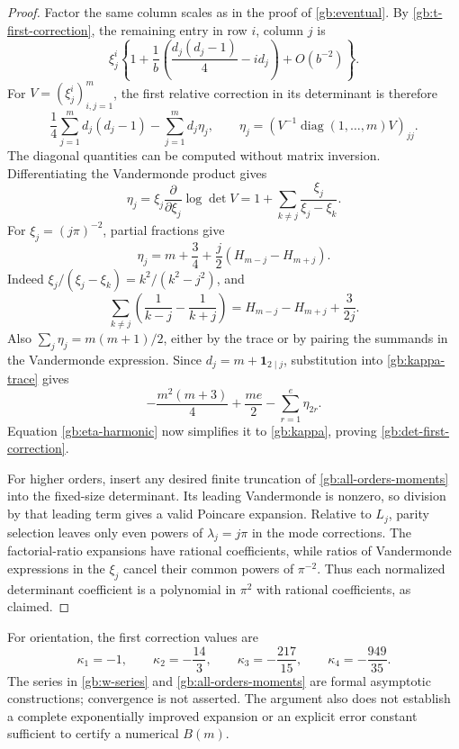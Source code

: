 \documentclass[11pt,a4paper]{article}
\numberwithin{equation}{section}
\theoremstyle{definition}
\theoremstyle{remark}
\newcommand{\ind}{\mathbf 1}
\begin{document}
\begin{proof}
Factor the same column scales as in the proof of
\cref{gb:eventual}.  By \eqref{gb:t-first-correction}, the remaining
entry in row $i$, column $j$ is
\[
 \xi_j^i\left\{1+\frac1b
           \left(\frac{d_j(d_j-1)}4-id_j\right)+O(b^{-2})\right\}.
\]
For $V=(\xi_j^i)_{i,j=1}^m$, the first relative correction in its
determinant is therefore
\begin{equation}\label{gb:kappa-trace}
 \frac14\sum_{j=1}^md_j(d_j-1)-\sum_{j=1}^md_j\eta_j,
 \qquad
 \eta_j=\left(V^{-1}\operatorname{diag}(1,\ldots,m)V\right)_{jj}.
\end{equation}
The diagonal quantities can be computed without matrix inversion.
Differentiating the Vandermonde product gives
\[
 \eta_j=\xi_j\frac{\partial}{\partial\xi_j}\log\det V
       =1+\sum_{k\ne j}\frac{\xi_j}{\xi_j-\xi_k}.
\]
For $\xi_j=(j\pi)^{-2}$, partial fractions give
\begin{equation}\label{gb:eta-harmonic}
 \eta_j=m+\frac34+\frac j2(H_{m-j}-H_{m+j}).
\end{equation}
Indeed $\xi_j/(\xi_j-\xi_k)=k^2/(k^2-j^2)$, and
\[
 \sum_{k\ne j}\left(\frac1{k-j}-\frac1{k+j}\right)
        =H_{m-j}-H_{m+j}+\frac{3}{2j}.
\]
Also $\sum_j\eta_j=m(m+1)/2$, either by the trace or by
pairing the summands in the Vandermonde expression.  Since
$d_j=m+\ind_{2\mid j}$, substitution into
\eqref{gb:kappa-trace} gives
\[
 -\frac{m^2(m+3)}4+\frac{me}{2}
                         -\sum_{r=1}^e\eta_{2r}.
\]
Equation \eqref{gb:eta-harmonic} now simplifies it to
\eqref{gb:kappa}, proving \eqref{gb:det-first-correction}.

For higher orders, insert any desired finite truncation of
\eqref{gb:all-orders-moments} into the fixed-size determinant.
Its leading Vandermonde is nonzero, so division by that leading
term gives a valid Poincare expansion.  Relative to $L_j$, parity
selection leaves only even powers of $\lambda_j=j\pi$ in the
mode corrections.  The factorial-ratio expansions have rational
coefficients, while ratios of Vandermonde expressions in the
$\xi_j$ cancel their common powers of $\pi^{-2}$.  Thus each
normalized determinant coefficient is a polynomial in $\pi^2$
with rational coefficients, as claimed.
\end{proof}

For orientation, the first correction values are
\[
 \kappa_1=-1,\qquad\kappa_2=-\frac{14}{3},\qquad
 \kappa_3=-\frac{217}{15},\qquad\kappa_4=-\frac{949}{35}.
\]
The series in \eqref{gb:w-series} and
\eqref{gb:all-orders-moments} are formal asymptotic constructions;
convergence is not asserted.  The argument also does not establish
a complete exponentially improved expansion or an explicit error
constant sufficient to certify a numerical $B(m)$.
\end{document}
